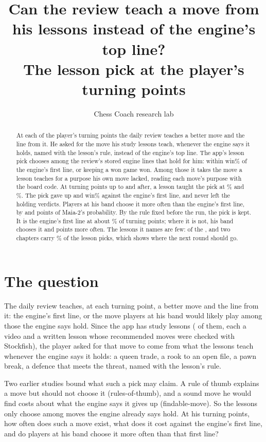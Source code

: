 \documentclass[11pt]{article}
\title{Can the review teach a move from his lessons instead of the engine's top line?\\[0.3em]
\large The lesson pick at the player's turning points}
\author{Chess Coach research lab}
\date{}
\begin{document}
\maketitle

\begin{abstract}
At each of the player's turning points the daily review teaches a better move and the line from
it. He asked for the move his study lessons teach, whenever the engine says it holds, named with
the lesson's rule, instead of the engine's top line. The app's lesson pick chooses among the
review's stored engine lines that hold for him: within \Window{} win\% of the engine's first line,
or keeping a won game won. Among those it takes the move a lesson teaches for a purpose his own
move lacked, reading each move's purpose with the board code. At \TrainTPs{} turning points up to
\TrainUntil{} and \HeldTPs{} after, a lesson taught the pick at \TrainCoverage\% and
\HeldCoverage\%. The pick gave up \TrainCost{} and \HeldCost{} win\% against the engine's first
line, and never left the holding verdicts. Players at his band choose it more often than the
engine's first line, by \TrainFind{} and \HeldFind{} points of Maia-2's probability. By the rule
fixed before the run, the pick is kept. It is the engine's first line at about \TrainIsTop\% of
turning points; where it is not, his band chooses it \TrainGainWhere{} and \HeldGainWhere{}
points more often. The lessons it names are few: \LessonsAll{} of the \Lessons, and two chapters
carry \TwoShare\% of the lesson picks, which shows where the next round should go.
\end{abstract}

\section{The question}

The daily review teaches, at each turning point, a better move and the line from it: the
engine's first line, or the move players at his band would likely play among those the engine
says hold. Since the app has study lessons (\Lessons{} of them, each a video and a written lesson
whose recommended moves were checked with Stockfish), the player asked for that move to come from
what the lessons teach whenever the engine says it holds: a queen trade, a rook to an open file,
a pawn break, a defence that meets the threat, named with the lesson's rule.

Two earlier studies bound what such a pick may claim. A rule of thumb explains a move but should
not choose it (rules-of-thumb), and a sound move he would find costs about what the engine says
it gives up (findable-move). So the lessons only choose among moves the engine already says hold.
At his turning points, how often does such a move exist, what does it cost against the engine's
first line, and do players at his band choose it more often than that first line?
\end{document}
